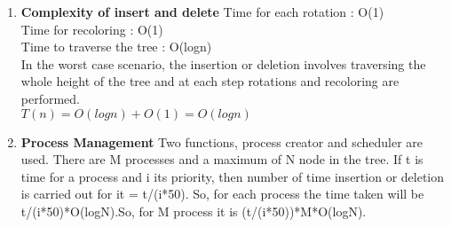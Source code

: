 \documentclass[a4paper,11pt]{article}
\begin{document}
\begin{enumerate}
  \item \textbf{Complexity of insert and delete}
 Time for each rotation : O(1)\\
 Time for recoloring : O(1)\\
 Time to traverse the tree : O(logn)\\
 In the worst case scenario, the insertion or deletion involves traversing the whole height of the tree and at each step rotations and recoloring are performed.\\
 $T(n) = O(logn) + O(1)
       = O(logn)$
       
 \item \textbf{Process Management}
Two functions, process creator and scheduler are used. There are M processes and a maximum of N node in the tree. If t is time for a process and i its priority, then number of time insertion or deletion is carried out for it = t/(i*50). So, for each process the time taken will be t/(i*50)*O(logN).So, for M process it is (t/(i*50))*M*O(logN).

\end{enumerate}
\end{document}

